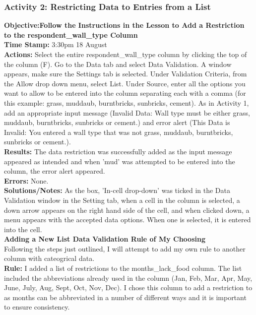 \documentclass{article}
\begin{document}
\begin{FlushLeft}
\subsubsection*{Activity 2: Restricting Data to Entries from a List}
\textbf{Objective:Follow the Instructions in the Lesson to Add a Restriction to the respondent\_wall\_type Column}\\ 
\textbf{Time Stamp:} 3:30pm 18 August\\
\textbf{Actions:} Select the entire respondent\_wall\_type column by clicking the top of the column (F). Go to the Data tab and select Data Validation. A window appears, make sure the Settings tab is selected. Under Validation Criteria, from the Allow drop down menu, select List. Under Source, enter all the options you want to allow to be entered into the column separating each with a comma (for this example: grass, muddaub, burntbricks, sunbricks, cement). As in Activity 1, add an appropriate input message (Invalid Data: Wall type must be either grass, muddaub, burntbricks, sunbricks or cement.) and error alert (This Data is Invalid: You entered a wall type that was not grass, muddaub, burntbricks, sunbricks or cement.).\\
\textbf{Results:} The data restriction was successfully added as the input message appeared as intended and when 'mud' was attempted to be entered into the column, the error alert appeared.\\
\textbf{Errors:} None.\\
\textbf{Solutions/Notes:} As the box, 'In-cell drop-down' was ticked in the Data Validation window in the Setting tab, when a cell in the column is selected, a down arrow appears on the right hand side of the cell, and when clicked down, a menu appears with the accepted data options. When one is selected, it is entered into the cell.\\
\vspace{5mm}
\textbf{Adding a New List Data Validation Rule of My Choosing}\\
Following the steps just outlined, I will attempt to add my own rule to another column with cateogrical data.\\
\textbf{Rule:} I added a list of restrictions to the months\_lack\_food column. The list included the abbreviations already used in the column (Jan, Feb, Mar, Apr, May, June, July, Aug, Sept, Oct, Nov, Dec). I chose this column to add a restriction to as months can be abbreviated in a number of different ways and it is important to ensure consistency.\\

\end{FlushLeft}
\end{document}
